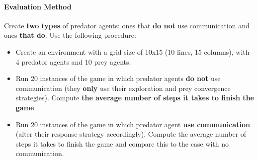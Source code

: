 \documentclass[a4paper, 12pt, twoside]{article}
\begin{document}
\paragraph*{\textbf{Evaluation Method}} Create \textbf{two types} of predator agents: ones that \textbf{do not} use communication and ones \textbf{that do}. Use the following procedure:
\begin{itemize}
	\item Create an environment with a grid size of 10x15 (10 lines, 15 columns), with 4 predator agents and 10 prey agents.
	\item Run 20 instances of the game in which predator agents \textbf{do not} use communication (they \textbf{only} use their exploration and prey convergence strategies). Compute \textbf{the average number of steps it takes to finish the game}.
	\item Run 20 instances of the game in which predator agent \textbf{use communication} (alter their response strategy accordingly). Compute the average number of steps it takes to finish the game and compare this to the case with no communication.
\end{itemize}

\clearpage%

\label{page2}
%
\end{document}
